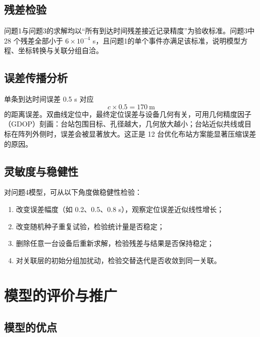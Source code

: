 \documentclass[12pt,a4paper]{article}
\begin{document}
\subsection{残差检验}

问题1与问题3的求解均以“所有到达时间残差接近记录精度”为验收标准。问题3中 28 个残差全部小于 $6\times10^{-4}$ s，且问题1的单个事件亦满足该标准，说明模型方程、坐标转换与关联分组自洽。

\subsection{误差传播分析}

单条到达时间误差 0.5 s 对应
\[
c\times0.5=170\ \mathrm{m}
\]
的距离误差。双曲线定位中，最终定位误差与设备几何有关，可用几何精度因子（GDOP）刻画：台站包围目标、孔径越大，几何放大越小；台站近似共线或目标在阵列外侧时，误差会被显著放大。这正是 12 台优化布站方案能显著压缩误差的原因。

\subsection{灵敏度与稳健性}

对问题4模型，可从以下角度做稳健性检验：
\begin{enumerate}[label=\arabic*.]
  \item 改变误差幅度（如 0.2、0.5、0.8 s），观察定位误差近似线性增长；
  \item 改变随机种子重复试验，检验统计量是否稳定；
  \item 删除任意一台设备后重新求解，检验残差与结果是否保持稳定；
  \item 对关联层的初始分组加扰动，检验交替迭代是否收敛到同一关联。
\end{enumerate}

\section{模型的评价与推广}

\subsection{模型的优点}

\end{document}
